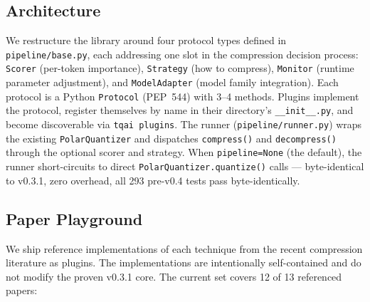 \documentclass[11pt,a4paper]{article}
\begin{document}
\subsection{Architecture}

We restructure the library around four protocol types defined in \texttt{pipeline/base.py}, each addressing one slot in the compression decision process: \texttt{Scorer} (per-token importance), \texttt{Strategy} (how to compress), \texttt{Monitor} (runtime parameter adjustment), and \texttt{ModelAdapter} (model family integration). Each protocol is a Python \texttt{Protocol} (PEP~544) with 3--4 methods. Plugins implement the protocol, register themselves by name in their directory's \texttt{\_\_init\_\_.py}, and become discoverable via \texttt{tqai plugins}. The runner (\texttt{pipeline/runner.py}) wraps the existing \texttt{PolarQuantizer} and dispatches \texttt{compress()} and \texttt{decompress()} through the optional scorer and strategy. When \texttt{pipeline=None} (the default), the runner short-circuits to direct \texttt{PolarQuantizer.quantize()} calls --- byte-identical to v0.3.1, zero overhead, all 293 pre-v0.4 tests pass byte-identically.

\subsection{Paper Playground}

We ship reference implementations of each technique from the recent compression literature as plugins. The implementations are intentionally self-contained and do not modify the proven v0.3.1 core. The current set covers 12 of 13 referenced papers:
\end{document}
